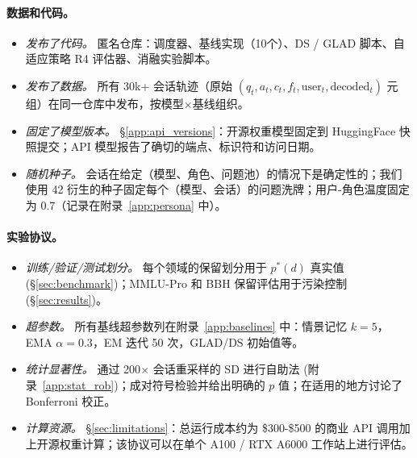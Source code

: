\documentclass[11pt,a4paper,fontset=fandol]{ctexart}
\begin{document}
\paragraph{数据和代码。}
\begin{itemize}[nosep,leftmargin=1.4em]
  \item \emph{发布了代码。} \checkmark{} 匿名仓库：调度器、基线实现（10个）、DS / GLAD 脚本、自适应策略 R4 评估器、消融实验脚本。
  \item \emph{发布了数据。} \checkmark{} 所有 30k+ 会话轨迹（原始 $(q_t, a_t, c_t, f_t, \text{user}_t, \text{decoded}_t)$ 元组）在同一仓库中发布，按模型$\times$基线组织。
  \item \emph{固定了模型版本。} \checkmark{} \S\ref{app:api_versions}：开源权重模型固定到 HuggingFace 快照提交；API 模型报告了确切的端点、标识符和访问日期。
  \item \emph{随机种子。} 会话在给定（模型、角色、问题池）的情况下是确定性的；我们使用 42 衍生的种子固定每个（模型、会话）的问题洗牌；用户-角色温度固定为 0.7（记录在附录~\ref{app:persona} 中）。
\end{itemize}

\paragraph{实验协议。}
\begin{itemize}[nosep,leftmargin=1.4em]
  \item \emph{训练/验证/测试划分。} \checkmark{} 每个领域的保留划分用于 $p^*(d)$ 真实值 (\S\ref{sec:benchmark})；MMLU-Pro 和 BBH 保留评估用于污染控制 (\S\ref{sec:results})。
  \item \emph{超参数。} \checkmark{} 所有基线超参数列在附录~\ref{app:baselines} 中：情景记忆 $k=5$，EMA $\alpha=0.3$，EM 迭代 50 次，GLAD/DS 初始值等。
  \item \emph{统计显著性。} \checkmark{} 通过 200$\times$ 会话重采样的 SD 进行自助法 (附录~\ref{app:stat_rob})；成对符号检验并给出明确的 $p$ 值；在适用的地方讨论了 Bonferroni 校正。
  \item \emph{计算资源。} \S\ref{sec:limitations}：总运行成本约为 \$300-\$500 的商业 API 调用加上开源权重计算；该协议可以在单个 A100 / RTX A6000 工作站上进行评估。
\end{itemize}
\end{document}
